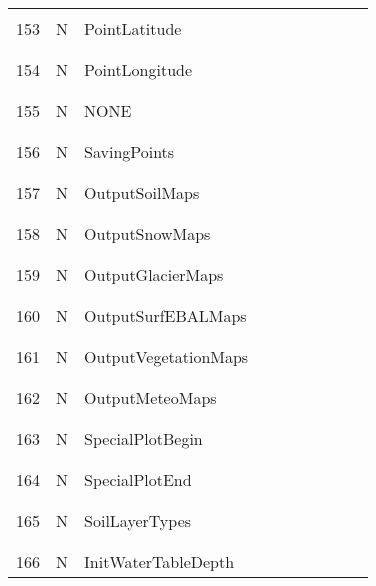 \begin{longtable}{|c|c|l|c|c|c|c|p{}|c|p{}|}
&&&&&&&&&\\
153 & N & PointLatitude & & & & & & & \\
&&&&&&&&&\\\hline%
&&&&&&&&&\\
154 & N & PointLongitude & & & & & & & \\
&&&&&&&&&\\\hline%
&&&&&&&&&\\
155 & N & NONE & & & & & & & \\
&&&&&&&&&\\\hline%
&&&&&&&&&\\
156 & N & SavingPoints & & & & & & & \\
&&&&&&&&&\\\hline%
&&&&&&&&&\\
157 & N & OutputSoilMaps & & & & & & & \\
&&&&&&&&&\\\hline%
&&&&&&&&&\\
158 & N & OutputSnowMaps & & & & & & & \\
&&&&&&&&&\\\hline%
&&&&&&&&&\\
159 & N & OutputGlacierMaps & & & & & & & \\
&&&&&&&&&\\\hline%
&&&&&&&&&\\
160 & N & OutputSurfEBALMaps & & & & & & & \\
&&&&&&&&&\\\hline%
&&&&&&&&&\\
161 & N & OutputVegetationMaps & & & & & & & \\
&&&&&&&&&\\\hline%
&&&&&&&&&\\
162 & N & OutputMeteoMaps & & & & & & & \\
&&&&&&&&&\\\hline%
&&&&&&&&&\\
163 & N & SpecialPlotBegin & & & & & & & \\
&&&&&&&&&\\\hline%
&&&&&&&&&\\
164 & N & SpecialPlotEnd & & & & & & & \\
&&&&&&&&&\\\hline%
&&&&&&&&&\\
165 & N & SoilLayerTypes & & & & & & & \\
&&&&&&&&&\\\hline%
&&&&&&&&&\\
166 & N & InitWaterTableDepth & & & & & & & \\

\end{longtable}
